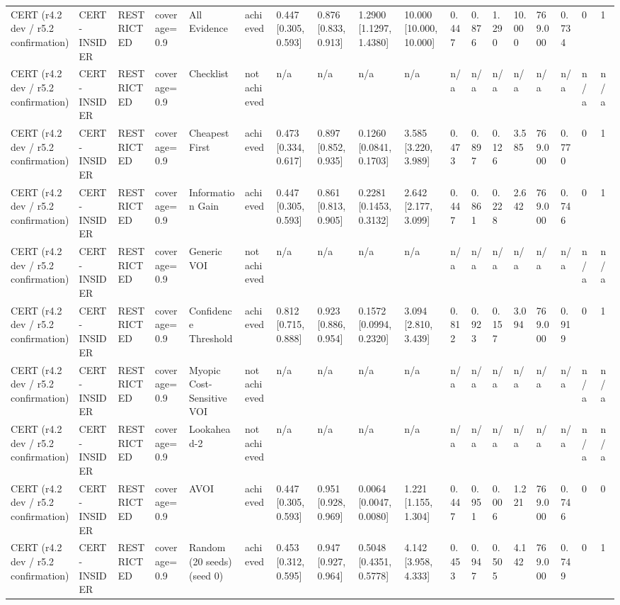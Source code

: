 \begin{table}[!ht]
{\begin{tabular}{llllllllllllllllll}
CERT (r4.2 dev / r5.2 confirmation) & CERT-INSIDER & RESTRICTED & coverage=0.9 & All Evidence & achieved & 0.447 [0.305, 0.593] & 0.876 [0.833, 0.913] & 1.2900 [1.1297, 1.4380] & 10.000 [10.000, 10.000] & 0.447 & 0.876 & 1.290 & 10.000 & 769.000 & 0.734 & 0 & 1 \\
CERT (r4.2 dev / r5.2 confirmation) & CERT-INSIDER & RESTRICTED & coverage=0.9 & Checklist & not achieved & n/a & n/a & n/a & n/a & n/a & n/a & n/a & n/a & n/a & n/a & n/a & n/a \\
CERT (r4.2 dev / r5.2 confirmation) & CERT-INSIDER & RESTRICTED & coverage=0.9 & Cheapest First & achieved & 0.473 [0.334, 0.617] & 0.897 [0.852, 0.935] & 0.1260 [0.0841, 0.1703] & 3.585 [3.220, 3.989] & 0.473 & 0.897 & 0.126 & 3.585 & 769.000 & 0.770 & 0 & 1 \\
CERT (r4.2 dev / r5.2 confirmation) & CERT-INSIDER & RESTRICTED & coverage=0.9 & Information Gain & achieved & 0.447 [0.305, 0.593] & 0.861 [0.813, 0.905] & 0.2281 [0.1453, 0.3132] & 2.642 [2.177, 3.099] & 0.447 & 0.861 & 0.228 & 2.642 & 769.000 & 0.746 & 0 & 1 \\
CERT (r4.2 dev / r5.2 confirmation) & CERT-INSIDER & RESTRICTED & coverage=0.9 & Generic VOI & not achieved & n/a & n/a & n/a & n/a & n/a & n/a & n/a & n/a & n/a & n/a & n/a & n/a \\
CERT (r4.2 dev / r5.2 confirmation) & CERT-INSIDER & RESTRICTED & coverage=0.9 & Confidence Threshold & achieved & 0.812 [0.715, 0.888] & 0.923 [0.886, 0.954] & 0.1572 [0.0994, 0.2320] & 3.094 [2.810, 3.439] & 0.812 & 0.923 & 0.157 & 3.094 & 769.000 & 0.919 & 0 & 1 \\
CERT (r4.2 dev / r5.2 confirmation) & CERT-INSIDER & RESTRICTED & coverage=0.9 & Myopic Cost-Sensitive VOI & not achieved & n/a & n/a & n/a & n/a & n/a & n/a & n/a & n/a & n/a & n/a & n/a & n/a \\
CERT (r4.2 dev / r5.2 confirmation) & CERT-INSIDER & RESTRICTED & coverage=0.9 & Lookahead-2 & not achieved & n/a & n/a & n/a & n/a & n/a & n/a & n/a & n/a & n/a & n/a & n/a & n/a \\
CERT (r4.2 dev / r5.2 confirmation) & CERT-INSIDER & RESTRICTED & coverage=0.9 & AVOI & achieved & 0.447 [0.305, 0.593] & 0.951 [0.928, 0.969] & 0.0064 [0.0047, 0.0080] & 1.221 [1.155, 1.304] & 0.447 & 0.951 & 0.006 & 1.221 & 769.000 & 0.746 & 0 & 0 \\
CERT (r4.2 dev / r5.2 confirmation) & CERT-INSIDER & RESTRICTED & coverage=0.9 & Random (20 seeds) (seed 0) & achieved & 0.453 [0.312, 0.595] & 0.947 [0.927, 0.964] & 0.5048 [0.4351, 0.5778] & 4.142 [3.958, 4.333] & 0.453 & 0.947 & 0.505 & 4.142 & 769.000 & 0.749 & 0 & 1 \\
\bottomrule
\end{tabular}}
\end{table}
